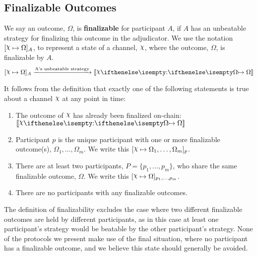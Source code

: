 \subsection{Finalizable Outcomes}\label{sec:finalizable-outcomes}

We say an outcome, $\Omega$, is \textbf{finalizable} for participant $A$, if $A$ has an unbeatable
strategy for finalizing this outcome in the adjudicator.
We use the notation $\finalizable{\rchi}{\Omega}{A}$, to represent a state of a channel, $\rchi$,
where the outcome, $\Omega$, is finalizable by $A$.
\begin{align}
  \finalizable{\rchi}{\Omega}{A} \xrightarrow{\text{A's unbeatable strategy}} \adj{\holds{\rchi}{}{\Omega}}
\end{align}

It follows from the definition that exactly one of the following statements is true about
a channel $\rchi$ at any point in time:
\begin{enumerate}
  \item The outcome of $\rchi$ has already been finalized on-chain: $\adj{\holds{\rchi}{}{\Omega}}$
  \item Participant $p$ is the unique participant with one or more finalizable outcome(s), $\Omega_1, \dots, \Omega_m$.
        We write this $\finalizable{\rchi}{\Omega_1, \dots, \Omega_m}{p}$.
  \item There are at least two participants, $P = \{p_1, \dots, p_m \}$, who share the same
        finalizable outcome, $\Omega$. We write this $\finalizable{\rchi}{\Omega}{p_1, \dots, p_m}$.
  \item There are no participants with any finalizable outcomes.
\end{enumerate}
The definition of finalizability excludes the case where two different finalizable outcomes are held
by different participants, as in this case at least one participant's strategy would be beatable
by the other participant's strategy.
None of the protocols we present make use of the final situation, where no participant has a finalizable outcome, and we believe this state should generally be avoided.

